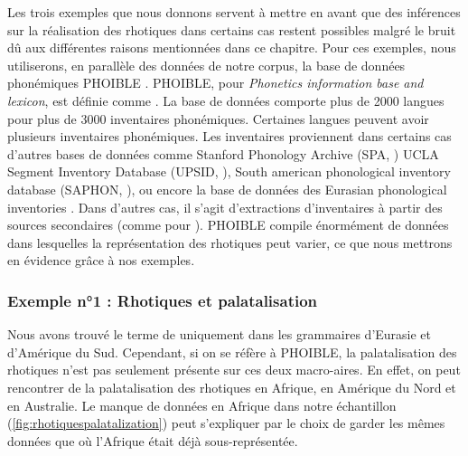 Les trois exemples que nous donnons servent à mettre en avant que des inférences sur la réalisation des rhotiques dans certains cas restent possibles malgré le bruit dû aux différentes raisons mentionnées dans ce chapitre. Pour ces exemples, nous utiliserons, en parallèle des données de notre corpus, la base de données phonémiques PHOIBLE \parencite{phoible}. PHOIBLE, pour \textit{Phonetics information base and lexicon}, est définie comme  \parencite[171]{moranPhoneticsInformationBase2012}. La base de données comporte plus de 2000 langues pour plus de 3000 inventaires phonémiques. Certaines langues peuvent avoir plusieurs inventaires phonémiques. Les inventaires proviennent dans certains cas d'autres bases de données comme Stanford Phonology Archive (SPA, \cite{spa1979}) UCLA Segment Inventory Database (UPSID, \cite{maddiesonPatternsSounds1984,maddiesonprecoda1990}), South american phonological inventory database (SAPHON, \cite{saphon}), ou encore la base de données des Eurasian phonological inventories \parencite{nikolaev_etal2015}. Dans d'autres cas, il s'agit d'extractions d'inventaires à partir des sources secondaires (comme pour \cite{moran_etal2014}). PHOIBLE compile énormément de données dans lesquelles la représentation des rhotiques peut varier, ce que nous mettrons en évidence grâce à nos exemples.\\


\subsubsection{Exemple n°1 : Rhotiques et palatalisation}

Nous avons trouvé le terme de  uniquement dans les grammaires d'Eurasie et d'Amérique du Sud.
Cependant, si on se réfère à PHOIBLE, la palatalisation des rhotiques n'est pas seulement présente sur ces deux macro-aires. En effet, on peut rencontrer de la palatalisation des rhotiques en Afrique, en Amérique du Nord et en Australie.
Le manque de données en Afrique dans notre échantillon (\autoref{fig:rhotiquespalatalization}) peut s'expliquer par le choix de garder les mêmes données que \textcite{winterTrilledAssociatedRoughness2022} où l'Afrique était déjà sous-représentée.\\

